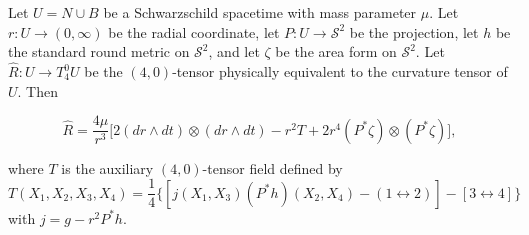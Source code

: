Let $U = N \cup B$ be a Schwarzschild spacetime with mass parameter $\mu$. Let $r: U \to (0,\infty)$ be the radial coordinate, let $P: U \to \mathcal{S}^2$ be the projection, let $h$ be the standard round metric on $\mathcal{S}^2$, and let $\zeta$ be the area form on $\mathcal{S}^2$. Let $\hat{R}: U \to T_4^0 U$ be the $(4,0)$-tensor physically equivalent to the curvature tensor of $U$. Then

$$\hat{R} = \frac{4\mu}{r^3}\Big[2(dr \wedge dt) \otimes (dr \wedge dt) - r^2 T + 2r^4(P^* \zeta) \otimes (P^* \zeta)\Big],$$

where $T$ is the auxiliary $(4,0)$-tensor field defined by
$$T(X_1, X_2, X_3, X_4) = \frac{1}{4}\Big\{[j(X_1, X_3)(P^* h)(X_2, X_4) - (1 \leftrightarrow 2)] - [3 \leftrightarrow 4]\Big\}$$
with $j = g - r^2 P^* h$.
